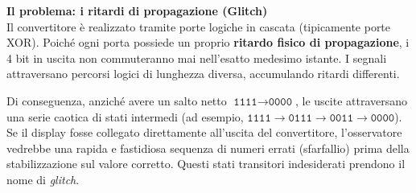 \textbf{Il problema: i ritardi di propagazione (Glitch)}\\
Il convertitore è realizzato tramite porte logiche in cascata (tipicamente porte XOR). Poiché ogni porta possiede un proprio \textbf{ritardo fisico di propagazione}, i 4 bit in uscita non commuteranno mai nell'esatto medesimo istante. I segnali attraversano percorsi logici di lunghezza diversa, accumulando ritardi differenti.

Di conseguenza, anziché avere un salto netto $\texttt{1111} \to \texttt{0000}$, le uscite attraversano una serie caotica di stati intermedi (ad esempio, $\texttt{1111} \to \texttt{0111} \to \texttt{0011} \to \texttt{0000}$). Se il display fosse collegato direttamente all'uscita del convertitore, l'osservatore vedrebbe una rapida e fastidiosa sequenza di numeri errati (sfarfallio) prima della stabilizzazione sul valore corretto. Questi stati transitori indesiderati prendono il nome di \emph{glitch}.

\begin{center}
\end{center}

